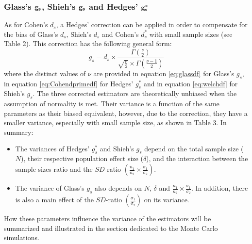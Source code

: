 \documentclass[
  english,
  man,floatsintext]{apa6}
\providecommand{\tightlist}{%
  \setlength{\itemsep}{0pt}\setlength{\parskip}{0pt}}
\begin{document}
\hypertarget{glasss-bf-g_s-shiehs-bf-g_s-and-hedges-bf-g_s}{%
\subsubsection{\texorpdfstring{Glass's \(\bf g_s\), Shieh's \(\bf g_s\) and Hedges' \(\bf g^*_s\)}{Glass's \textbackslash bf g\_s, Shieh's \textbackslash bf g\_s and Hedges' \textbackslash bf g\^{}*\_s}}\label{glasss-bf-g_s-shiehs-bf-g_s-and-hedges-bf-g_s}}

As for Cohen's \(d_s\), a Hedges' correction can be applied in order to compensate for the bias of Glass's \(d_s\), Shieh's \(d_s\) and Cohen's \(d^*_s\) with small sample sizes (see Table 2). This correction has the following general form:
\begin{equation*} 
g_s = d_s \times \frac{\Gamma(\frac{\nu}{2})}{\sqrt{\frac{\nu}{2}} \times \Gamma(\frac{\nu-1}{2})}
\end{equation*}
where the distinct values of \(\nu\) are provided in equation \ref{eq:glassdf} for Glass's \(g_s\), in equation \ref{eq:Cohendprimedf} for Hedges' \(g^*_s\) and in equation \ref{eq:welchdf} for Shieh's \(g_s\). The three corrected estimators are theoretically unbiased when the assumption of normality is met. Their variance is a function of the same parameters as their biased equivalent, however, due to the correction, they have a smaller variance, especially with small sample size, as shown in Table 3. In summary:

\begin{itemize}
\tightlist
\item
  The variances of Hedges' \(g^*_s\) and Shieh's \(g_s\) depend on the total sample size (\(N\)), their respective population effect size (\(\delta\)), and the interaction between the sample sizes ratio and the \(SD\)-ratio \(\left(\frac{n_1}{n_2}\times\frac{\sigma_1}{\sigma_2} \right)\).\\
\item
  The variance of Glass's \(g_s\) also depends on \(N\), \(\delta\) and \(\frac{n_1}{n_2}\times\frac{\sigma_1}{\sigma_2}\). In addition, there is also a main effect of the \(SD\)-ratio \(\left(\frac{\sigma_1}{\sigma_2} \right)\) on its variance.
\end{itemize}

How these parameters influence the variance of the estimators will be summarized and illustrated in the section dedicated to the Monte Carlo simulations.
\end{document}
